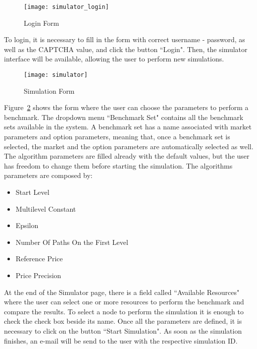 \documentclass[11pt,a4paper]{article}
\begin{document}
\begin{figure}[h]
	\begin{center}
		\texttt{[image: simulator\_login]}
		\caption{Login Form\label{fig:login}}
	\end{center}
\end{figure}

To login, it is necessary to fill in the form with correct username - password, as well as the CAPTCHA value, and click the button ``Login".
Then, the simulator interface will be available, allowing the user to perform new simulations.

\begin{figure}[h]
	\begin{center}
		\texttt{[image: simulator]}
		\caption{Simulation Form\label{fig:simulator}}
	\end{center}
\end{figure}

Figure~\ref{fig:simulator} shows the form where the user can choose the parameters to perform a benchmark.
The dropdown menu ``Benchmark Set" contains all the benchmark sets available in the system.
A benchmark set has a name associated with market parameters and option parameters, meaning that, once a benchmark set is selected, the market and the option parameters are automatically selected as well.
The algorithm parameters are filled already with the default values, but the user has freedom to change them before starting the simulation.
The algorithms parameters are composed by:
\begin{itemize}
	\item Start Level
	\item Multilevel Constant
	\item Epsilon
	\item Number Of Paths On the First Level
	\item Reference Price
	\item Price Precision
\end{itemize}

At the end of the Simulator page, there is a field called ``Available Resources" where the user can select one or more resources to perform the benchmark and compare the results. 
To select a node to perform the simulation it is enough to check the check box beside its name.
Once all the parameters are defined, it is necessary to click on the button ``Start Simulation".
As soon as the simulation finishes, an e-mail will be send to the user with the respective simulation ID.
\end{document}

